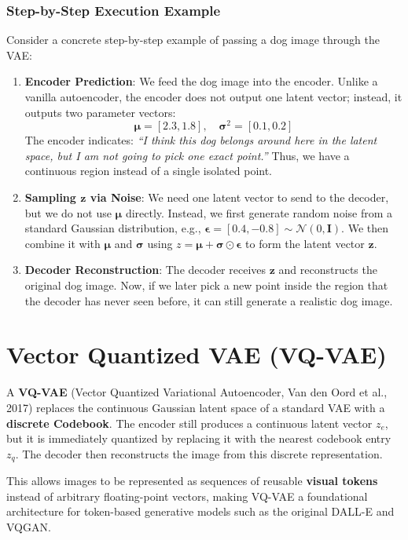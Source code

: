 \subsubsection*{Step-by-Step Execution Example}
Consider a concrete step-by-step example of passing a dog image through the VAE:
\begin{enumerate}
    \item \textbf{Encoder Prediction}: We feed the dog image into the encoder. Unlike a vanilla autoencoder, the encoder does not output one latent vector; instead, it outputs two parameter vectors:
    \[
    \boldsymbol{\mu} = [2.3, 1.8], \quad \boldsymbol{\sigma}^2 = [0.1, 0.2]
    \]
    The encoder indicates: \emph{``I think this dog belongs around here in the latent space, but I am not going to pick one exact point.''} Thus, we have a continuous region instead of a single isolated point.

    \item \textbf{Sampling $\mathbf{z}$ via Noise}: We need one latent vector to send to the decoder, but we do not use $\boldsymbol{\mu}$ directly. Instead, we first generate random noise from a standard Gaussian distribution, e.g., $\boldsymbol{\epsilon} = [0.4, -0.8] \sim \mathcal{N}(0, \mathbf{I})$. We then combine it with $\boldsymbol{\mu}$ and $\boldsymbol{\sigma}$ using $z = \boldsymbol{\mu} + \boldsymbol{\sigma} \odot \boldsymbol{\epsilon}$ to form the latent vector $\mathbf{z}$.

    \item \textbf{Decoder Reconstruction}: The decoder receives $\mathbf{z}$ and reconstructs the original dog image. Now, if we later pick a new point inside the region that the decoder has never seen before, it can still generate a realistic dog image.
\end{enumerate}

\section{Vector Quantized VAE (VQ-VAE)}

A \textbf{VQ-VAE} (Vector Quantized Variational Autoencoder, Van den Oord et al., 2017) replaces the continuous Gaussian latent space of a standard VAE with a \textbf{discrete Codebook}. The encoder still produces a continuous latent vector $z_e$, but it is immediately quantized by replacing it with the nearest codebook entry $z_q$. The decoder then reconstructs the image from this discrete representation.

This allows images to be represented as sequences of reusable \textbf{visual tokens} instead of arbitrary floating-point vectors, making VQ-VAE a foundational architecture for token-based generative models such as the original DALL-E and VQGAN.

